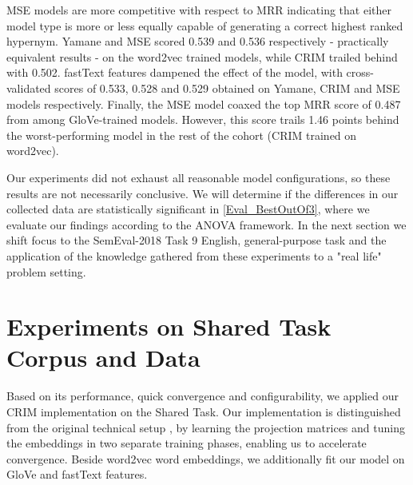 \ac{MSE} models are more competitive with respect to \ac{MRR} indicating that either model type is more or less equally capable of generating a correct highest ranked hypernym.  Yamane and MSE scored 0.539 and 0.536 respectively - practically equivalent results - on the word2vec trained models, while CRIM trailed behind with 0.502.  fastText features dampened the effect of the model, with cross-validated scores of 0.533, 0.528 and 0.529 obtained on Yamane, CRIM and MSE models respectively.  Finally, the MSE model coaxed the top \ac{MRR} score of 0.487 from among GloVe-trained models.  However, this score trails 1.46 points behind the worst-performing model in the rest of the cohort (CRIM trained on word2vec).

Our experiments did not exhaust all reasonable model configurations, so these results are not necessarily conclusive.  We will determine if the differences in our collected data are statistically significant in \cref{Eval_BestOutOf3}, where we evaluate our findings according to the \ac{ANOVA} framework.  In the next section we shift focus to the SemEval-2018 Task 9 English, general-purpose task and the application of the knowledge gathered from these experiments to a "real life" problem setting.

\section{Experiments on Shared Task Corpus and Data}
Based on its performance, quick convergence and configurability, we applied our CRIM implementation on the Shared Task.  Our implementation is distinguished from the original technical setup \citep{bernier2018crim}, by learning the projection matrices and tuning the embeddings in two separate training phases, enabling us to accelerate convergence.  Beside word2vec word embeddings, we additionally fit our model on GloVe and fastText features.

